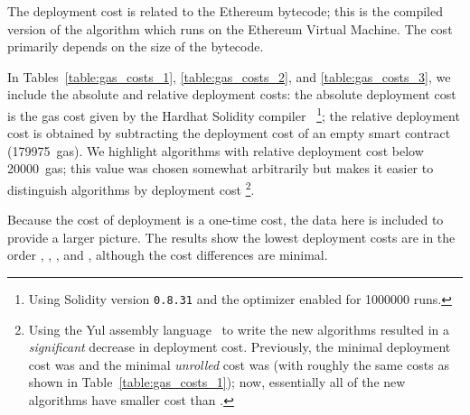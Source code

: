 The deployment cost is related to the Ethereum bytecode;
this is the compiled version of the algorithm
which runs on the Ethereum Virtual Machine.
The cost primarily depends on the size of the bytecode.

In Tables~\ref{table:gas_costs_1}, \ref{table:gas_costs_2},
and \ref{table:gas_costs_3},
we include the absolute and relative deployment costs:
the absolute deployment cost is the gas cost given
by the Hardhat Solidity compiler~\cite{hardhat}%
\footnote{Using Solidity version \texttt{0.8.31}
and the optimizer enabled for \num{1000000} runs.};
the relative deployment cost is obtained by subtracting
the deployment cost of an empty smart contract
(\num{179975}~gas).
We highlight algorithms with relative deployment cost below \num{20000}~gas;
this value was chosen somewhat arbitrarily
but makes it easier to distinguish algorithms
by deployment cost%
\footnote{Using the Yul assembly language~\cite{YulLanguage}
to write the new algorithms resulted in a \emph{significant}
decrease in deployment cost.
Previously, the minimal deployment cost was \Uniswap{}
and the minimal \emph{unrolled} cost was \OpenZeppelinTwo{}
(with roughly the same costs as shown in Table~\ref{table:gas_costs_1});
now, essentially all of the new algorithms have smaller cost than \Uniswap{}.
}.

Because the cost of deployment is a one-time cost,
the data here is included to provide a larger picture.
The results show the lowest deployment costs
are in the order
\WhileTwo{}, \UnrolledThree{}, \UnrolledOne{},
and \UnrolledTwo{},
although the cost differences are minimal.

